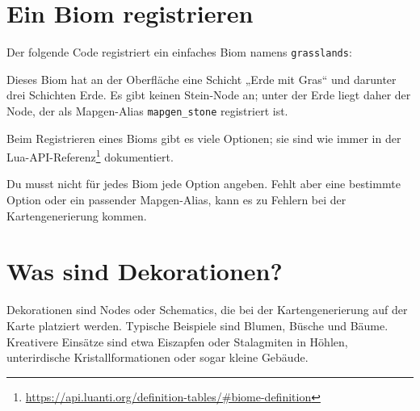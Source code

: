 \section{Ein Biom registrieren}\label{ein-biom-registrieren}

Der folgende Code registriert ein einfaches Biom namens
\texttt{grasslands}:

\begin{Shaded}
\begin{Highlighting}[]
\OperatorTok{(\{}
     \OperatorTok{=} \OperatorTok{,}
     \OperatorTok{=} \OperatorTok{,}
     \OperatorTok{=} \OperatorTok{,}
     \OperatorTok{=} \OperatorTok{,}
     \OperatorTok{=} \OperatorTok{,}
     \OperatorTok{=} \OperatorTok{,}
     \OperatorTok{=} \OperatorTok{{-}}\OperatorTok{,}
     \OperatorTok{=} \OperatorTok{,}
     \OperatorTok{=} \OperatorTok{,}
\OperatorTok{\})}
\end{Highlighting}
\end{Shaded}

Dieses Biom hat an der Oberfläche eine Schicht „Erde mit Gras`` und
darunter drei Schichten Erde. Es gibt keinen Stein-Node an; unter der
Erde liegt daher der Node, der als Mapgen-Alias
\texttt{mapgen\_\allowbreak{}stone} registriert ist.

Beim Registrieren eines Bioms gibt es viele Optionen; sie sind wie immer
in der Lua-API-Referenz\footnote{\url{https://api.luanti.org/definition-tables/\#biome-definition}}
dokumentiert.

Du musst nicht für jedes Biom jede Option angeben. Fehlt aber eine
bestimmte Option oder ein passender Mapgen-Alias, kann es zu Fehlern bei
der Kartengenerierung kommen.

\section{Was sind Dekorationen?}\label{was-sind-dekorationen}

Dekorationen sind Nodes oder Schematics, die bei der Kartengenerierung
auf der Karte platziert werden. Typische Beispiele sind Blumen, Büsche
und Bäume. Kreativere Einsätze sind etwa Eiszapfen oder Stalagmiten in
Höhlen, unterirdische Kristallformationen oder sogar kleine Gebäude.

